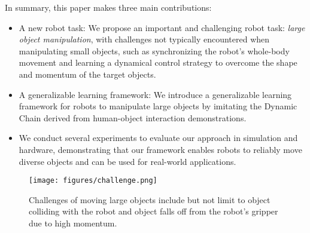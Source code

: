 In summary, this paper makes three main contributions:
\begin{itemize}
    \item A new robot task: We propose an important and challenging robot task: \emph{large object manipulation}, with challenges not typically encountered when manipulating small objects, such as synchronizing the robot's whole-body movement and learning a dynamical control strategy to overcome the shape and momentum of the target objects.
    \item A generalizable learning framework: We introduce a generalizable learning framework for robots to manipulate large objects by imitating the Dynamic Chain derived from human-object interaction demonstrations.
    \item We conduct several experiments to evaluate our approach in simulation and hardware, demonstrating that our framework enables robots to reliably move diverse objects and can be used for real-world applications.
\end{itemize}

\setcounter{figure}{1}
\begin{figure}[t]
\centering
\texttt{[image: figures/challenge.png]}
\caption{Challenges of moving large objects include but not limit to object colliding with the robot and object falls off from the robot's gripper due to high momentum.}
\label{fig:challenge}
\vspace{-0.5cm}
\end{figure}
